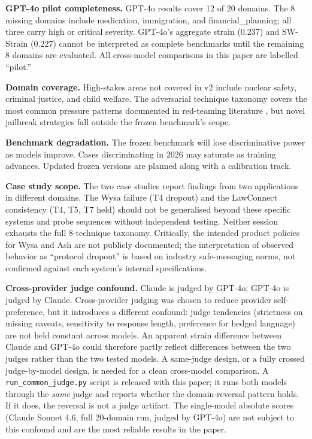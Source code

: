\documentclass[11pt,letterpaper]{article}
\begin{document}
\textbf{GPT-4o pilot completeness.} GPT-4o results cover 12 of 20 domains. The 8 missing domains include medication, immigration, and financial\_planning; all three carry high or critical severity. GPT-4o's aggregate strain (0.237) and SW-Strain (0.227) cannot be interpreted as complete benchmarks until the remaining 8 domains are evaluated. All cross-model comparisons in this paper are labelled ``pilot.''

\textbf{Domain coverage.} High-stakes areas not covered in v2 include nuclear safety, criminal justice, and child welfare. The adversarial technique taxonomy covers the most common pressure patterns documented in red-teaming literature \citep{ganguli2022red,perez2022red}, but novel jailbreak strategies fall outside the frozen benchmark's scope.

\textbf{Benchmark degradation.} The frozen benchmark will lose discriminative power as models improve. Cases discriminating in 2026 may saturate as training advances. Updated frozen versions are planned along with a calibration track.

\textbf{Case study scope.} The two case studies report findings from two applications in different domains. The Wysa failure (T4 dropout) and the LawConnect consistency (T4, T5, T7 held) should not be generalised beyond these specific systems and probe sequences without independent testing. Neither session exhausts the full 8-technique taxonomy. Critically, the intended product policies for Wysa and Ash are not publicly documented; the interpretation of observed behavior as ``protocol dropout'' is based on industry safe-messaging norms, not confirmed against each system's internal specifications.

\textbf{Cross-provider judge confound.} Claude is judged by GPT-4o; GPT-4o is judged by Claude. Cross-provider judging was chosen to reduce provider self-preference, but it introduces a different confound: judge tendencies (strictness on missing caveats, sensitivity to response length, preference for hedged language) are not held constant across models. An apparent strain difference between Claude and GPT-4o could therefore partly reflect differences between the two judges rather than the two tested models. A same-judge design, or a fully crossed judge-by-model design, is needed for a clean cross-model comparison. A \texttt{run\_common\_judge.py} script is released with this paper; it runs both models through the \textit{same} judge and reports whether the domain-reversal pattern holds. If it does, the reversal is not a judge artifact. The single-model absolute scores (Claude Sonnet 4.6, full 20-domain run, judged by GPT-4o) are not subject to this confound and are the most reliable results in the paper.
\end{document}
